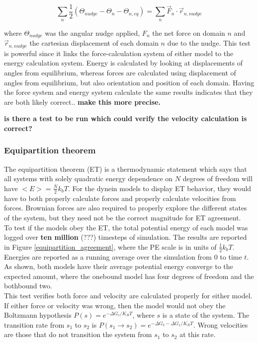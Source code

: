\documentclass[10pt]{article} %
\begin{document}
\begin{equation}
  \sum_n \frac12 \left(\Theta_{nudge} - \Theta_{n} - \Theta_{n,eq}\right) = \sum_n \vec{F}_n \cdot \vec{r}_{n,nudge}
\end{equation}

where $\Theta_{nudge}$ was the angular nudge applied, $F_n$ the net force on domain $n$ and $\vec{r}_{n,nudge}$ the cartesian displacement of each domain $n$ due to the nudge. This test is powerful since it links the force-calculation system of either model to the energy calculation system. Energy is calculated by looking at displacements of angles from equilibrium, whereas forces are calculated using displacement of angles from equilibrium, but also orientation and position of each domain. Having the force system and energy system calculate the same results indicates that they are both likely correct.. \textbf{make this more precise.}

\textbf{is there a test to be run which could verify the velocity calculation is correct?}

\subsubsection{Equipartition theorem}
The equipartition theorem (ET) is a thermodynamic statement which says that all systems with solely quadratic energy dependence on $N$ degrees of freedom will have $<E> = \frac N2 k_bT$. For the dynein models to display ET behavior, they would have to both properly calculate forces and properly calculate velocities from forces. Brownian forces are also required to properly explore the different states of the system, but they need not be the correct magnitude for ET agreement.\\

To test if the models obey the ET, the total potential energy of each model was logged over \textbf{ten million} (???) timesteps of simulation. The results are reported in Figure \ref{equipartition_agreement}, where the PE scale is in units of $\frac12 k_bT$. Energies are reported as a running average over the simulation from 0 to time $t$. As shown, both models have their average potential energy converge to the expected amount, where the onebound model has four degrees of freedom and the bothbound two.\\

This test verifies both force and velocity are calculated properly for either model. If either force or velocity was wrong, then the model would not obey the Boltzmann hypothesis $P(s) = e^{-\Delta G_{s}/K_BT}$, where $s$ is a state of the system. The transition rate from $s_1$ to $s_2$ is $P(s_1\rightarrow s_2) = e^{-{\Delta G_2 - \Delta G_1}/K_BT}$. Wrong velocities are those that do not transition the system from $s_1$ to $s_2$ at this rate.\\
\end{document}
